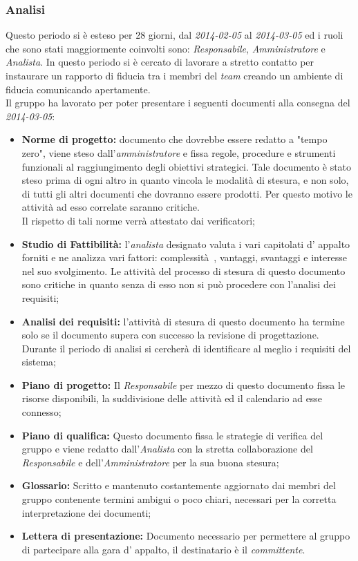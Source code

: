 \subsubsection{Analisi}
Questo periodo si è esteso per 28 giorni, dal \textit{2014-02-05} al \textit{2014-03-05} ed i ruoli che sono stati maggiormente coinvolti sono: \textit{Responsabile}, \textit{Amministratore} e \textit{Analista}.
In questo periodo si è cercato di lavorare a stretto contatto per instaurare un rapporto di fiducia tra i membri del \textit{team} creando un ambiente di fiducia comunicando apertamente.
\\
Il gruppo \gruppo ha lavorato per poter presentare i seguenti documenti alla consegna del \textit{2014-03-05}:\\
\begin{itemize}
	\item \textbf{Norme di progetto:} documento che dovrebbe essere redatto a "tempo zero", viene steso dall'\textit{amministratore} e fissa regole, procedure e strumenti funzionali al raggiungimento degli obiettivi strategici. Tale documento è stato steso prima di ogni altro in quanto vincola le modalità di stesura, e non solo, di tutti gli altri documenti che dovranno essere prodotti. Per questo motivo le attività ad esso correlate saranno critiche.
	\\ Il rispetto di tali norme verrà attestato dai verificatori;
	\item \textbf{Studio di Fattibilità:} l'\textit{analista} designato valuta i vari capitolati d' appalto forniti e ne analizza vari fattori: complessità~, vantaggi, svantaggi e interesse nel suo svolgimento. Le attività del processo di stesura di questo documento sono critiche in quanto senza di esso non si può procedere con l'analisi dei requisiti;
	\item \textbf{Analisi dei requisiti:} l'attività di stesura di questo documento ha termine solo se il documento supera con successo la revisione di progettazione. Durante il periodo di analisi si cercherà di identificare al meglio i requisiti del sistema;
	\item \textbf{Piano di progetto:} Il \textit{Responsabile} per mezzo di questo documento fissa le risorse disponibili, la suddivisione delle attività ed il calendario ad esse connesso; 
	\item \textbf{Piano di qualifica:} Questo documento fissa le strategie di verifica del gruppo e viene redatto dall'\textit{Analista} con la stretta collaborazione del \textit{Responsabile} e dell'\textit{Amministratore} per la sua buona stesura;
	\item \textbf{Glossario:} Scritto e mantenuto costantemente aggiornato dai membri del gruppo contenente termini ambigui o poco chiari, necessari per la corretta interpretazione dei documenti;
	\item \textbf{Lettera di presentazione:} Documento necessario per permettere al gruppo di partecipare alla gara d' appalto, il destinatario è il \textit{committente}.
\end{itemize}
